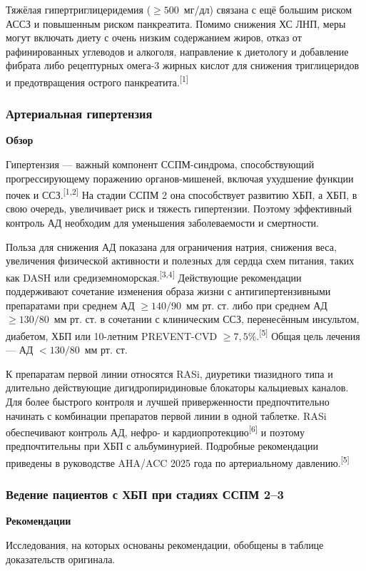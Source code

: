 \documentclass[11pt,a4paper]{article}
\newcommand{\src}[1]{\textsuperscript{[#1]}}
\newcommand{\heading}[1]{\par\medskip\textbf{#1}\par}
\begin{document}
Тяжёлая гипертриглицеридемия ($\geq500$~мг/дл) связана с ещё большим риском АССЗ и повышенным риском панкреатита. Помимо снижения ХС ЛНП, меры могут включать диету с очень низким содержанием жиров, отказ от рафинированных углеводов и алкоголя, направление к диетологу и добавление фибрата либо рецептурных омега-3 жирных кислот для снижения триглицеридов и предотвращения острого панкреатита.\src{1}

\subsubsection{Артериальная гипертензия}
\heading{Обзор}
Гипертензия --- важный компонент ССПМ-синдрома, способствующий прогрессирующему поражению органов-мишеней, включая ухудшение функции почек и ССЗ.\src{1,2} На стадии ССПМ 2 она способствует развитию ХБП, а ХБП, в свою очередь, увеличивает риск и тяжесть гипертензии. Поэтому эффективный контроль АД необходим для уменьшения заболеваемости и смертности.

Польза для снижения АД показана для ограничения натрия, снижения веса, увеличения физической активности и полезных для сердца схем питания, таких как DASH или средиземноморская.\src{3,4} Действующие рекомендации поддерживают сочетание изменения образа жизни с антигипертензивными препаратами при среднем АД $\geq140/90$~мм рт. ст. либо при среднем АД $\geq130/80$~мм рт. ст. в сочетании с клиническим ССЗ, перенесённым инсультом, диабетом, ХБП или 10-летним PREVENT-CVD $\geq7{,}5\%$.\src{5} Общая цель лечения --- АД $<130/80$~мм рт. ст.

К препаратам первой линии относятся RASi, диуретики тиазидного типа и длительно действующие дигидропиридиновые блокаторы кальциевых каналов. Для более быстрого контроля и лучшей приверженности предпочтительно начинать с комбинации препаратов первой линии в одной таблетке. RASi обеспечивают контроль АД, нефро- и кардиопротекцию\src{6} и поэтому предпочтительны при ХБП с альбуминурией. Подробные рекомендации приведены в руководстве AHA/ACC 2025 года по артериальному давлению.\src{5}

\subsubsection{Ведение пациентов с ХБП при стадиях ССПМ 2--3}
\heading{Рекомендации}
Исследования, на которых основаны рекомендации, обобщены в таблице доказательств оригинала.
\end{document}
